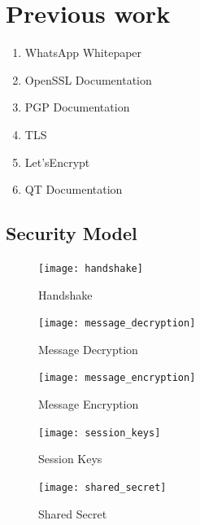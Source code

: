 \documentclass[12pt]{article}
\begin{document}
\section{Previous work }
\begin{enumerate}

\item WhatsApp Whitepaper
\item OpenSSL Documentation
\item PGP Documentation
\item TLS
\item Let’sEncrypt
\item QT Documentation

\end{enumerate}

\subsection{Security Model}
\label{sub:security_model}
\begin{figure}[h]
\caption{Handshake}
\label{fig:handshake}
\centering
\texttt{[image: handshake]}
\end{figure}

\begin{figure}[h]
\caption{Message Decryption}
\label{fig:message_decryption}
\centering
\texttt{[image: message\_decryption]}
\end{figure}

\begin{figure}[h]
\caption{Message Encryption}
\label{fig:message_encryption}
\centering
\texttt{[image: message\_encryption]}
\end{figure}

\begin{figure}[h]
\caption{Session Keys}
\label{fig:session_keys}
\centering
\texttt{[image: session\_keys]}
\end{figure}

\begin{figure}[h]
\caption{Shared Secret}
\label{fig:shared_secret}
\centering
\texttt{[image: shared\_secret]}
\end{figure}
\end{document}
